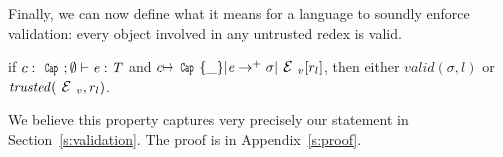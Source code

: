 \noindent Finally, we can now define what it means for a language to soundly enforce validation: every object involved in any untrusted redex is valid.

\begin{theorem}
if $c:\Kw{Cap};\emptyset\vdash \e: \T$ and
$c\mapsto\Kw{Cap}\{\_\}|\e\rightarrow^+ \sigma|\ctx_v[r_l]$, then
either $valid(\sigma,l)$ or $\mathit{trusted}(\ctx_v,r_l)$.
\end{theorem}

We believe this property captures very precisely our statement in Section~\ref{s:validation}.
The proof is in Appendix~\ref{s:proof}. 
